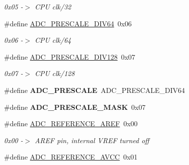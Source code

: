 \begin{CompactItemize}
\begin{CompactList}\small\item\em 0x05 -$>$ CPU clk/32 \item\end{CompactList}\item 
\hypertarget{group__a2d_g5ad4cc849977e40d0a2a98c304a4be7b}{
\#define \hyperlink{group__a2d_g5ad4cc849977e40d0a2a98c304a4be7b}{ADC\_\-PRESCALE\_\-DIV64}~0x06}
\label{group__a2d_g5ad4cc849977e40d0a2a98c304a4be7b}

\begin{CompactList}\small\item\em 0x06 -$>$ CPU clk/64 \item\end{CompactList}\item 
\hypertarget{group__a2d_g56e8398ed5a4236f10dadb6d7d5e1a3b}{
\#define \hyperlink{group__a2d_g56e8398ed5a4236f10dadb6d7d5e1a3b}{ADC\_\-PRESCALE\_\-DIV128}~0x07}
\label{group__a2d_g56e8398ed5a4236f10dadb6d7d5e1a3b}

\begin{CompactList}\small\item\em 0x07 -$>$ CPU clk/128 \item\end{CompactList}\item 
\hypertarget{group__a2d_g624110d24f42aac3b062f18495e04b51}{
\#define \textbf{ADC\_\-PRESCALE}~ADC\_\-PRESCALE\_\-DIV64}
\label{group__a2d_g624110d24f42aac3b062f18495e04b51}

\item 
\hypertarget{group__a2d_g97010ca07f7fab62f9fb4b4c404e6a90}{
\#define \textbf{ADC\_\-PRESCALE\_\-MASK}~0x07}
\label{group__a2d_g97010ca07f7fab62f9fb4b4c404e6a90}

\item 
\hypertarget{group__a2d_g69a5e4e3dcfeec25908050a0d328788f}{
\#define \hyperlink{group__a2d_g69a5e4e3dcfeec25908050a0d328788f}{ADC\_\-REFERENCE\_\-AREF}~0x00}
\label{group__a2d_g69a5e4e3dcfeec25908050a0d328788f}

\begin{CompactList}\small\item\em 0x00 -$>$ AREF pin, internal VREF turned off \item\end{CompactList}\item 
\hypertarget{group__a2d_g9697b28b449eee80f6f6bd31c29eaa48}{
\#define \hyperlink{group__a2d_g9697b28b449eee80f6f6bd31c29eaa48}{ADC\_\-REFERENCE\_\-AVCC}~0x01}
\label{group__a2d_g9697b28b449eee80f6f6bd31c29eaa48}


\end{CompactItemize}
